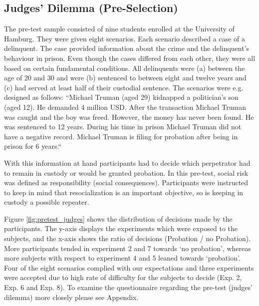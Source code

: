 \FloatBarrier
\subsection{Judges’ Dilemma (Pre-Selection)}
The pre-test sample consisted of nine students enrolled at the University of Hamburg. They were given eight scenarios. Each scenario described a case of a delinquent. The case provided information about the crime and the delinquent’s behaviour in prison. Even though the cases differed from each other, they were all based on certain fundamental conditions. All delinquents were (a) between the age of 20 and 30 and were (b) sentenced to between eight and twelve years and (c) had served at least half of their custodial sentence. The scenarios were e.g. designed as follows: “Michael Truman (aged 29) kidnapped a politician's son (aged 12). He demanded 4 million USD. After the transaction Michael Truman was caught and the boy was freed. However, the money has never been found. He was sentenced to 12 years. During his time in prison Michael Truman did not have a negative record. Michael Truman is filing for probation after being in prison for 6 years.“\par
With this information at hand participants had to decide which perpetrator had to remain in custody or would be granted probation. In this pre-test, social risk was defined as responsibility (social consequences). Participants were instructed to keep in mind that resocialization is an important objective, so is keeping in custody a possible repeater.\par
Figure \ref{fig:pretest_judges} shows the distribution of decisions made by the participants. The y-axis displays the experiments which were exposed to the subjects, and the x-axis shows the ratio of decisions (Probation / no Probation). More participants tended in experiment 2 and 7 towards ‘no probation’, whereas more subjects with respect to experiment 4 and 5 leaned towards ‘probation’. Four of the eight scenarios complied with our expectations and three experiments were accepted due to high rate of difficulty for the subjects to decide (Exp. 2, Exp. 6 and Exp. 8). To examine the questionnaire regarding the pre-test (judges’ dilemma) more closely please see Appendix.

